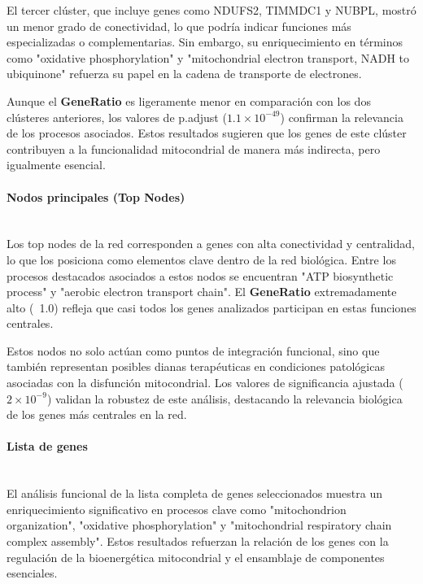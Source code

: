 El tercer clúster, que incluye genes como NDUFS2, TIMMDC1 y NUBPL, mostró un menor grado de conectividad, lo que podría indicar funciones más especializadas o complementarias. Sin embargo, su enriquecimiento en términos como "oxidative phosphorylation" y "mitochondrial electron transport, NADH to ubiquinone" refuerza su papel en la cadena de transporte de electrones.

Aunque el \textbf{GeneRatio} es ligeramente menor en comparación con los dos clústeres anteriores, los valores de p.adjust (\( 1.1 \times 10^{-49} \)) confirman la relevancia de los procesos asociados. Estos resultados sugieren que los genes de este clúster contribuyen a la funcionalidad mitocondrial de manera más indirecta, pero igualmente esencial.

\paragraph{Nodos principales (Top Nodes)} \mbox{}\\

Los top nodes de la red corresponden a genes con alta conectividad y centralidad, lo que los posiciona como elementos clave dentro de la red biológica. Entre los procesos destacados asociados a estos nodos se encuentran "ATP biosynthetic process" y "aerobic electron transport chain". El \textbf{GeneRatio} extremadamente alto (~1.0) refleja que casi todos los genes analizados participan en estas funciones centrales.

Estos nodos no solo actúan como puntos de integración funcional, sino que también representan posibles dianas terapéuticas en condiciones patológicas asociadas con la disfunción mitocondrial. Los valores de significancia ajustada (\( 2 \times 10^{-9} \)) validan la robustez de este análisis, destacando la relevancia biológica de los genes más centrales en la red.

\paragraph{Lista de genes} \mbox{}\\

El análisis funcional de la lista completa de genes seleccionados muestra un enriquecimiento significativo en procesos clave como "mitochondrion organization", "oxidative phosphorylation" y "mitochondrial respiratory chain complex assembly". Estos resultados refuerzan la relación de los genes con la regulación de la bioenergética mitocondrial y el ensamblaje de componentes esenciales.

